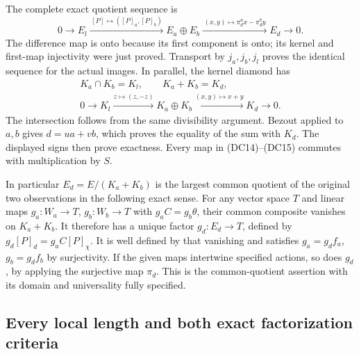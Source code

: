 The complete exact quotient sequence is
\[
 0\longrightarrow E_l
 \xrightarrow{\, [P]\mapsto([P]_a,[P]_b)\,}
 E_a\oplus E_b
 \xrightarrow{\, (x,y)\mapsto\pi_d^a x-\pi_d^b y\,}
 E_d\longrightarrow0 .
 \tag{DC14}
\]
The difference map is onto because its first component is onto;
its kernel and first-map injectivity were just proved.  Transport by
$j_a,j_b,j_l$ proves the identical sequence for the actual images.
In parallel, the kernel diamond has
\[
 \begin{gathered}
 K_a\cap K_b=K_l,\qquad K_a+K_b=K_d,\\
 0\longrightarrow K_l
 \xrightarrow{z\mapsto(z,-z)}K_a\oplus K_b
 \xrightarrow{(x,y)\mapsto x+y}K_d\longrightarrow0 .
 \end{gathered}
 \tag{DC15}
\]
The intersection follows from the same divisibility argument.
Bezout applied to $a,b$ gives $d=ua+vb$, which proves the equality
of the sum with $K_d$.  The displayed signs then prove exactness.
Every map in (DC14)--(DC15) commutes with multiplication by $S$.

In particular $E_d=E/(K_a+K_b)$ is the largest common quotient of
the original two observations in the following exact sense.
For any vector space $T$ and linear maps $g_a:W_a\to T$,
$g_b:W_b\to T$ with $g_aC=g_b\theta$, their common composite
vanishes on $K_a+K_b$.  It therefore has a unique factor
$g_d:E_d\to T$, defined by $g_d[P]_d=g_aC[P]_\chi$.
It is well defined by that vanishing and satisfies
$g_a=g_df_a$, $g_b=g_df_b$ by surjectivity.  If the given maps
intertwine specified actions, so does $g_d$, by applying the
surjective map $\pi_d$.  This is the common-quotient assertion
with its domain and universality fully specified.

\subsection{Every local length and both exact factorization criteria}


